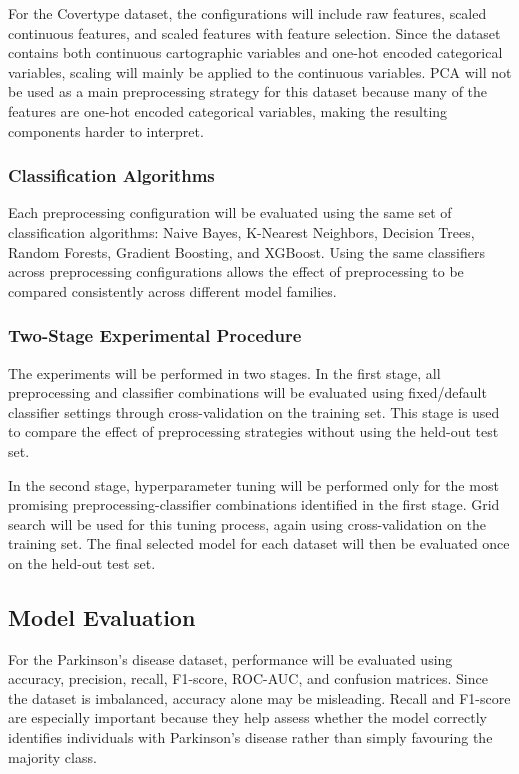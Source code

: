 \documentclass[11pt,a4paper]{article}
\begin{document}
For the Covertype dataset, the configurations will include raw features,
scaled continuous features, and scaled features with feature selection. Since
the dataset contains both continuous cartographic variables and one-hot
encoded categorical variables, scaling will mainly be applied to the
continuous variables. PCA will not be used as a main preprocessing strategy
for this dataset because many of the features are one-hot encoded categorical
variables, making the resulting components harder to interpret.

\subsubsection{Classification Algorithms}

Each preprocessing configuration will be evaluated using the same set of
classification algorithms: Naive Bayes, K-Nearest Neighbors, Decision Trees,
Random Forests, Gradient Boosting, and XGBoost. Using the same classifiers
across preprocessing configurations allows the effect of preprocessing to be
compared consistently across different model families.

\subsubsection{Two-Stage Experimental Procedure}

The experiments will be performed in two stages. In the first stage, all
preprocessing and classifier combinations will be evaluated using
fixed/default classifier settings through cross-validation on the training
set. This stage is used to compare the effect of preprocessing strategies
without using the held-out test set.

In the second stage, hyperparameter tuning will be performed only for the most
promising preprocessing-classifier combinations identified in the first stage.
Grid search will be used for this tuning process, again using cross-validation
on the training set. The final selected model for each dataset will then be
evaluated once on the held-out test set.

\subsection{Model Evaluation}

For the Parkinson's disease dataset, performance will be evaluated using
accuracy, precision, recall, F1-score, ROC-AUC, and confusion matrices. Since
the dataset is imbalanced, accuracy alone may be misleading. Recall and
F1-score are especially important because they help assess whether the model
correctly identifies individuals with Parkinson's disease rather than simply
favouring the majority class.
\end{document}
